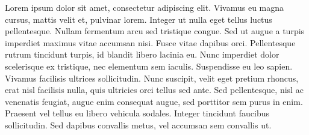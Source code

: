 Lorem ipsum dolor sit amet, consectetur adipiscing elit. Vivamus eu magna cursus, mattis velit et, pulvinar lorem. Integer ut nulla eget tellus luctus pellentesque. Nullam fermentum arcu sed tristique congue. Sed ut augue a turpis imperdiet maximus vitae accumsan nisi. Fusce vitae dapibus orci. Pellentesque rutrum tincidunt turpis, id blandit libero lacinia eu. Nunc imperdiet dolor scelerisque ex tristique, nec elementum sem iaculis. Suspendisse eu leo sapien. Vivamus facilisis ultrices sollicitudin. Nunc suscipit, velit eget pretium rhoncus, erat nisl facilisis nulla, quis ultricies orci tellus sed ante. Sed pellentesque, nisl ac venenatis feugiat, augue enim consequat augue, sed porttitor sem purus in enim. Praesent vel tellus eu libero vehicula sodales. Integer tincidunt faucibus sollicitudin. Sed dapibus convallis metus, vel accumsan sem convallis ut.